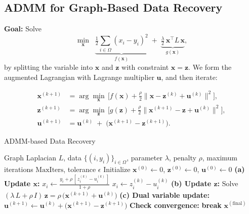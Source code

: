 \documentclass[12pt]{article}                                %
\begin{document}
\subsection{ADMM for Graph-Based Data Recovery}

\noindent
\textbf{Goal:} Solve
\[
\min_{\mathbf{x}} \;\; \underbrace{\tfrac12\sum_{i\in \Omega}(x_i - y_i)^2}_{f(\mathbf{x})} 
\;+\;\underbrace{\tfrac{\lambda}{2}\,\mathbf{x}^\top L\,\mathbf{x}}_{g(\mathbf{x})},
\]
by splitting the variable into $\mathbf{x}$ and $\mathbf{z}$ with constraint $\mathbf{x} = \mathbf{z}$. We form the augmented Lagrangian with Lagrange multiplier $\mathbf{u}$, and then iterate:

\[
\begin{aligned}
\mathbf{x}^{(k+1)} &= \arg\min_{\mathbf{x}}\, \bigl[f(\mathbf{x}) + \tfrac{\rho}{2}\|\mathbf{x}-\mathbf{z}^{(k)}+\mathbf{u}^{(k)}\|^2\bigr],\\
\mathbf{z}^{(k+1)} &= \arg\min_{\mathbf{z}}\, \bigl[g(\mathbf{z}) + \tfrac{\rho}{2}\|\mathbf{x}^{(k+1)}-\mathbf{z}+\mathbf{u}^{(k)}\|^2\bigr],\\
\mathbf{u}^{(k+1)} &= \mathbf{u}^{(k)} \;+\;\bigl(\mathbf{x}^{(k+1)}-\mathbf{z}^{(k+1)}\bigr).
\end{aligned}
\]

\begin{algorithm}[H]
\caption{ADMM-based Data Recovery}
\label{alg:admm}
\begin{algorithmic}[1]
\Require Graph Laplacian $L$, data $\{(i,y_i)\}_{i\in \Omega}$, parameter $\lambda$, penalty $\rho$, maximum iterations $\text{MaxIters}$, tolerance $\epsilon$
\State Initialize $\mathbf{x}^{(0)} \gets 0$, $\mathbf{z}^{(0)} \gets 0$, $\mathbf{u}^{(0)} \gets 0$
  \Statex \textbf{(a) Update $\mathbf{x}$:}
      \quad
      $x_i \gets \frac{y_i + \rho\,[\,z_i^{(k)} - u_i^{(k)}\,]}{1 + \rho}$
    \Else
      $x_i \gets z_i^{(k)} - u_i^{(k)}$ \quad {}
    \EndIf
  \EndFor
  \Statex \textbf{(b) Update $\mathbf{z}$:}
  \State Solve $(\lambda\,L + \rho\,I)\,\mathbf{z} = \rho\,\bigl(\mathbf{x}^{(k+1)} + \mathbf{u}^{(k)}\bigr)$ 
  \Statex \textbf{(c) Dual variable update:}
  \State $\mathbf{u}^{(k+1)} \gets \mathbf{u}^{(k)} + \bigl(\mathbf{x}^{(k+1)} - \mathbf{z}^{(k+1)}\bigr)$
  \State \textbf{Check convergence:} 
      \State \textbf{break}
  \EndIf
\EndFor
\State \Return $\mathbf{x}^{(\text{final})}$
\end{algorithmic}
\end{algorithm}
\end{document}
